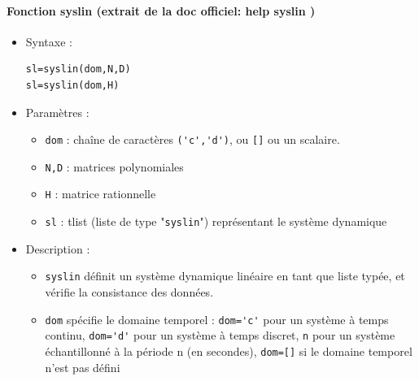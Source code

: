 \begin{doc}
\paragraph{Fonction syslin (extrait de la doc officiel: help syslin )}
    \begin{itemize}
        \item Syntaxe :
        \begin{code}
\begin{verbatim}
sl=syslin(dom,N,D)
sl=syslin(dom,H)
\end{verbatim}
        \end{code}
        \item Paramètres :
            \begin{itemize}
                \item \verb?dom? : chaîne de caractères \verb?('c','d')?, 
                      ou \verb?[]? ou un scalaire.
                \item \verb?N,D? : matrices polynomiales
                \item \verb?H?   : matrice rationnelle
                \item \verb?sl?  : tlist (liste de type "\verb?syslin?") 
                      représentant le système dynamique
            \end{itemize}
        \item Description : 
            \begin{itemize}
                \item \verb?syslin? définit un système dynamique linéaire en 
                      tant que liste typée, et vérifie la consistance des 
                      données.
                \item \verb?dom? spécifie le domaine temporel :
                      \verb?dom='c'? pour un système à temps continu, 
                      \verb?dom='d'? pour un système à temps discret, 
                      \verb?n? pour un système échantillonné à la période n 
                      (en secondes), 
                      \verb?dom=[]? si le domaine temporel n'est pas défini
            \end{itemize}
    \end{itemize}
\end{doc}

